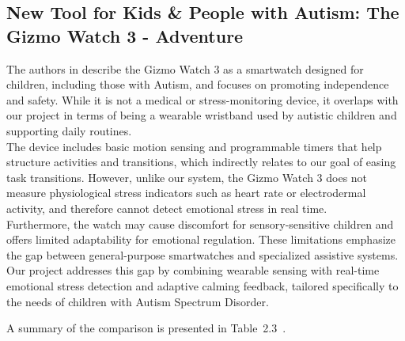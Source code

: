 \documentclass[a4paper,12pt]{report}
\begin{document}
\subsection{New Tool for Kids \& People with Autism: The Gizmo Watch 3 - Adventure}
The authors in \cite{verizon_GizmoWatch3_Autism} describe the Gizmo Watch 3 as a smartwatch designed for children, including those with Autism, and focuses on promoting independence and safety. While it is not a medical or stress-monitoring device, it overlaps with our project in terms of being a wearable wristband used by autistic children and supporting daily routines.\\[0.01cm]

The device includes basic motion sensing and programmable timers that help structure activities and transitions, which indirectly relates to our goal of easing task transitions. However, unlike our system, the Gizmo Watch 3 does not measure physiological stress indicators such as heart rate or electrodermal activity, and therefore cannot detect emotional stress in real time.\\[0.01cm]

Furthermore, the watch may cause discomfort for sensory-sensitive children and offers limited adaptability for emotional regulation. These limitations emphasize the gap between general-purpose smartwatches and specialized assistive systems. Our project addresses this gap by combining wearable sensing with real-time emotional stress detection and adaptive calming feedback, tailored specifically to the needs of children with Autism Spectrum Disorder.


\clearpage
A summary of the comparison is presented in Table 2.3 .
\end{document}
